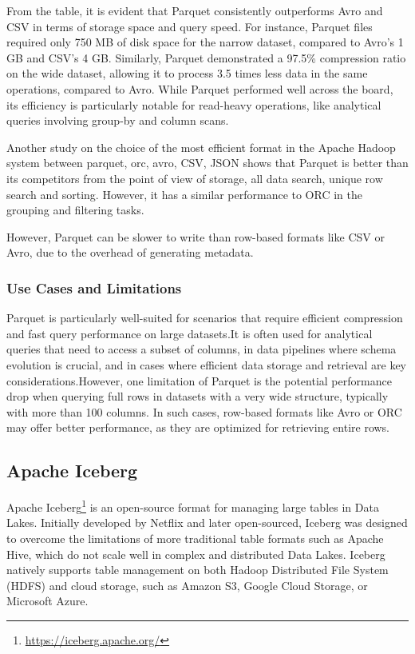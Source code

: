 From the table, it is evident that Parquet consistently outperforms Avro and \ac{CSV} in terms of storage space and query speed. For instance, Parquet files required only 750 MB of disk space for the narrow dataset, compared to Avro's 1 GB and \ac{CSV}'s 4 GB. Similarly, Parquet demonstrated a 97.5\% compression ratio on the wide dataset, allowing it to process 3.5 times less data in the same operations, compared to Avro. While Parquet performed well across the board, its efficiency is particularly notable for read-heavy operations, like analytical queries involving group-by and column scans.

Another study on the choice of the most efficient format in the Apache Hadoop system between parquet, orc, avro, \ac{CSV}, \ac{JSON} \cite{sym13020195} shows that Parquet is better than its competitors from the point of view of storage, all data search, unique row search and sorting. However, it has a similar performance to ORC in the grouping and filtering tasks.

However, Parquet can be slower to write than row-based formats like \ac{CSV} or Avro, due to the overhead of generating metadata.

\subsubsection{Use Cases and Limitations}

Parquet is particularly well-suited for scenarios that require efficient compression and fast query performance on large datasets.It is often used for analytical queries that need to access a subset of columns, in data pipelines where schema evolution is crucial, and in cases where efficient data storage and retrieval are key considerations.However, one limitation of Parquet is the potential performance drop when querying full rows in datasets with a very wide structure, typically with more than 100 columns. In such cases, row-based formats like Avro or ORC may offer better performance, as they are optimized for retrieving entire rows.

\subsection{Apache Iceberg}
Apache Iceberg\footnote{\url{https://iceberg.apache.org/}} is an open-source format for managing large tables in Data Lakes. Initially developed by Netflix and later open-sourced, Iceberg was designed to overcome the limitations of more traditional table formats such as Apache Hive, which do not scale well in complex and distributed Data Lakes. Iceberg natively supports table management on both Hadoop Distributed File System (HDFS) and cloud storage, such as Amazon \ac{S3}, Google Cloud Storage, or Microsoft Azure.


